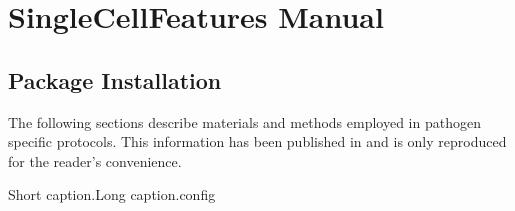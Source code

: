 \chapter{SingleCellFeatures Manual}

\section{Package Installation}
The following sections describe materials and methods employed in pathogen specific protocols. This information has been published in \cite{Ramo2014} and is only reproduced for the reader's convenience.


\begin{rlisting}{Short caption.}{Long caption.}{config}
  \inputminted[fontsize=\footnotesize,linenos,numbersep=4pt,style=igor]{yaml}{data/config.yaml}
\end{rlisting}
